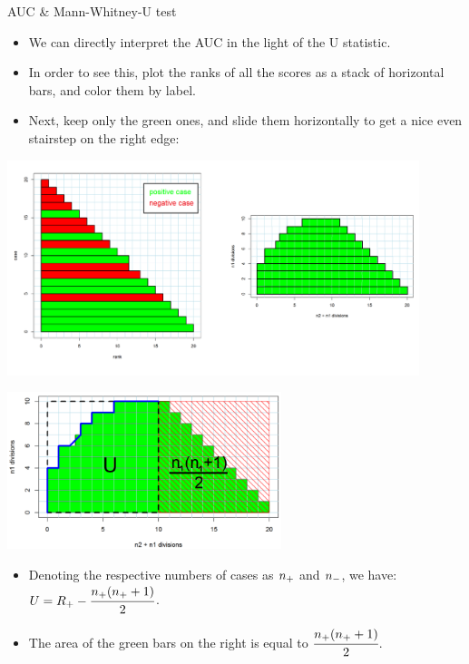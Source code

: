 \documentclass[11pt,compress,t,notes=noshow, xcolor=table]{beamer}
\begin{document}

\begin{vbframe}{AUC \& Mann-Whitney-U test}

\begin{itemize}
  \item We can directly interpret the AUC in the light of the U 
  statistic.
  \item In order to see this, plot the ranks of all the scores as a stack of 
  horizontal bars, and color them by label.
  \item Next, keep only the green ones, and slide them 
  horizontally to get a nice even stairstep on the right edge:
\end{itemize}
\begin{center}
\includegraphics[trim = 0 40 0 0, clip, width=0.9\textwidth]
{figure_man/roc-mannwhitney3.png}
\end{center}

\framebreak

\begin{center}
\includegraphics[width=0.6\textwidth]{figure_man/roc-mannwhitney2.png}
\end{center}

\begin{itemize}
  \item Denoting the respective numbers of cases as $n_{+}$ and $n_{-}$, we 
  have: $U = R_+ - \cfrac{n_{+}(n_{+} + 1)}{2}$.
  \item The area of the green bars on the right is equal to 
  $\cfrac{n_{+}(n_{+} + 1)}{2}$.
\end{itemize}


\end{vbframe}
\end{document}
